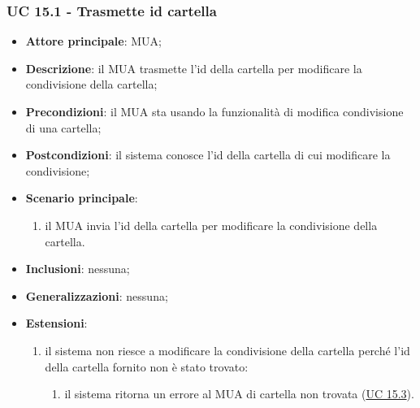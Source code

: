     \subsubsection{UC 15.1 - Trasmette id cartella} \label{sec:UC15.1}
    \begin{itemize}
        \item \textbf{Attore principale}: MUA;
        \item \textbf{Descrizione}: il MUA trasmette l'id della cartella per modificare la condivisione della cartella;
        \item \textbf{Precondizioni}: il MUA sta usando la funzionalità di modifica condivisione di una cartella;
        \item \textbf{Postcondizioni}: il sistema conosce l'id della cartella di cui modificare la condivisione;
        \item \textbf{Scenario principale}:
            \begin{enumerate}
                \item il MUA invia l'id della cartella per modificare la condivisione della cartella.
            \end{enumerate}
        \item \textbf{Inclusioni}: nessuna;
        \item \textbf{Generalizzazioni}: nessuna;
        \item \textbf{Estensioni}:
            \begin{enumerate}[label=\alph*.]
                \item il sistema non riesce a modificare la condivisione della cartella perché l'id della cartella fornito non è stato trovato:
                \begin{enumerate}[label=\arabic*.]
                    \item il sistema ritorna un errore al MUA di cartella non trovata (\hyperref[sec:UC15.3]{UC 15.3}).
                \end{enumerate}
            \end{enumerate}
    \end{itemize}


